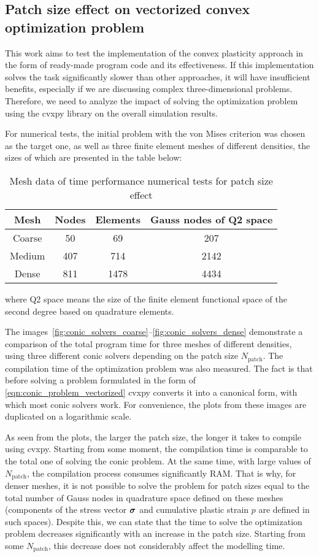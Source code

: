 \documentclass[12pt]{article}
\begin{document}
\subsection{Patch size effect on vectorized convex optimization problem}
This work aims to test the implementation of the convex plasticity approach in the form of ready-made program code and its effectiveness. If this implementation solves the task significantly slower than other approaches, it will have insufficient benefits, especially if we are discussing complex three-dimensional problems. Therefore, we need to analyze the impact of solving the optimization problem using the cvxpy library on the overall simulation results. 

For numerical tests, the initial problem with the von Mises criterion was chosen as the target one, as well as three finite element meshes of different densities, the sizes of which are presented in the table below:

\begin{table}[H]
	\centering
	\begin{tabular}{|cccc|}
		\hline
		Mesh & Nodes & Elements & Gauss nodes of Q2 space \\
		\hline
		Coarse & 50	& 69 & 207 \\
		Medium & 407 & 714 & 2142 \\
		Dense & 811	& 1478 & 4434 \\
		\hline
	\end{tabular}
	\caption{Mesh data of time performance numerical tests for patch size effect}
    \label{tab:cvxpy_tests}
\end{table}
where Q2 space means the size of the finite element functional space of the second degree based on quadrature elements.

The images~\ref{fig:conic_solvers_coarse}--\ref{fig:conic_solvers_dense} demonstrate a comparison of the total program time for three meshes of different densities, using three different conic solvers depending on the patch size $N_\text{patch}$. The compilation time of the optimization problem was also measured. The fact is that before solving a problem formulated in the form of \eqref{eqn:conic_problem_vectorized} cvxpy converts it into a canonical form, with which most conic solvers work. For convenience, the plots from these images are duplicated on a logarithmic scale.

As seen from the plots, the larger the patch size, the longer it takes to compile using cvxpy. Starting from some moment, the compilation time is comparable to the total one of solving the conic problem. At the same time, with large values of $N_\text{patch}$, the compilation process consumes significantly RAM. That is why, for denser meshes, it is not possible to solve the problem for patch sizes equal to the total number of Gauss nodes in quadrature space defined on these meshes (components of the stress vector $\mbox{\boldmath $\sigma$}$ and cumulative plastic strain $p$ are defined in such spaces). Despite this, we can state that the time to solve the optimization problem decreases significantly with an increase in the patch size. Starting from some $N_\text{patch}$, this decrease does not considerably affect the modelling time.
\end{document}
